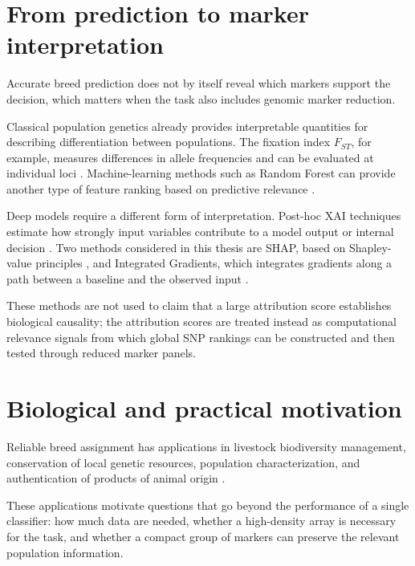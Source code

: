 \section{From prediction to marker interpretation}
\label{sec:black_box_xai}

Accurate breed prediction does not by itself reveal which markers
support the decision, which matters when the task also includes
genomic marker reduction.

Classical population genetics already provides interpretable
quantities for describing differentiation between populations. The
fixation index $F_{ST}$, for example, measures differences in allele
frequencies and can be evaluated at individual loci
\cite{wright1949genetical, weir1984estimating}. Machine-learning
methods such as Random Forest can provide another type of feature
ranking based on predictive relevance \cite{breiman2001random}.

Deep models require a different form of interpretation. Post-hoc XAI
techniques estimate how strongly input variables contribute to a model
output or internal decision
\cite{guidotti2018survey, arrieta2020explainable}. Two methods
considered in this thesis are SHAP, based on Shapley-value principles
\cite{shapley1953value, lundberg2017unified}, and Integrated
Gradients, which integrates gradients along a path between a baseline
and the observed input \cite{sundararajan2017axiomatic}.

These methods are not used to claim that a large attribution score
establishes biological causality; the attribution scores are treated
instead as computational relevance signals from which global SNP
rankings can be constructed and then tested through reduced marker
panels.

\section{Biological and practical motivation}
\label{sec:biological_economic_impact}

Reliable breed assignment has applications in livestock biodiversity
management, conservation of local genetic resources, population
characterization, and authentication of products of animal origin
\cite{groeneveld2010diversity, dalvit2007traceability,
      dimauro2013canonical}.

These applications motivate questions that go beyond the performance
of a single classifier: how much data are needed, whether a
high-density array is necessary for the task, and whether a compact
group of markers can preserve the relevant population information.

